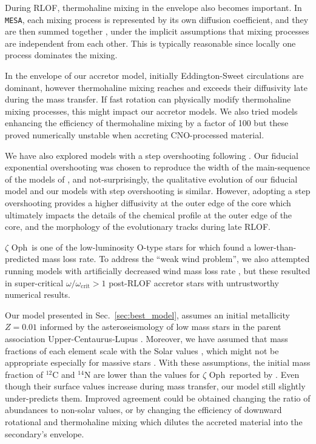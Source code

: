 \documentclass[twocolumn,twocolappendix,trackchanges]{aastex63}
\newcommand{\code}[1]{\texttt{#1}}
\newcommand{\MESA}{\code{MESA}}
\DeclareRobustCommand{\Secref}[1]{Sec.~\ref{#1}}
\newcommand{\zoph}{$\zeta$ Oph}
\begin{document}
During RLOF, thermohaline mixing in the envelope also becomes
important. In \MESA, each mixing process is represented by its own
diffusion coefficient, and they are then summed together
\citep[e.g.,][]{paxton:11}, under the implicit assumptions that mixing
processes are independent from each other. This is typically
reasonable since locally one process dominates the mixing.

In the envelope of our accretor model, initially Eddington-Sweet circulations are
dominant, however thermohaline mixing reaches and exceeds their
diffusivity late during the mass transfer. If fast rotation can
physically modify thermohaline mixing processes, this might impact our
accretor models.  We also tried models enhancing the efficiency of
thermohaline mixing by a factor of 100 \citep{schootemeijer:19} but
these proved numerically unstable when accreting CNO-processed material.

We have also explored models with a step overshooting following
\cite{brott:11}. Our fiducial exponential overshooting was chosen to
reproduce the width of the main-sequence of the models of
\cite{brott:11}, and not-surprisingly, the qualitative evolution of
our fiducial model and our models with step overshooting is
similar. However, adopting a step overshooting provides a higher
diffusivity at the outer edge of the core which ultimately impacts the
details of the chemical profile at the outer edge of the core, and the
morphology of the evolutionary tracks during late RLOF.

\zoph\ is one of the low-luminosity O-type stars for which
\cite{marcolino:09} found a lower-than-predicted mass loss rate.
To address the ``weak wind problem'', we also attempted
running models with artificially decreased wind mass loss rate
\citep[e.g.,][]{renzo:17}, but these resulted in super-critical
$\omega/\omega_\mathrm{crit}>1$ post-RLOF accretor stars with untrustworthy
numerical results.

Our model presented in \Secref{sec:best_model}, assumes an initial
metallicity $Z=0.01$ informed by the asteroseismology of low mass
stars in the parent association Upper-Centaurus-Lupus
\citep[e.g.,][]{murphy:21}. Moreover, we have assumed that mass
fractions of each element scale with the Solar values
\citep{grevesse:98}, which might not be appropriate especially for
massive stars \citep[e.g.,][]{grasha:21}. With these assumptions, the
initial mass fraction of $^{12}\mathrm{C}$ and $^{14}\mathrm{N}$ are
lower than the values for \zoph\ reported by
. Even though their surface values increase
during mass transfer, our model still slightly under-predicts
them. Improved agreement could be obtained changing the ratio of
abundances to non-solar values, or by changing the efficiency of
downward rotational and thermohaline mixing which dilutes the accreted
material into the secondary's envelope.
\end{document}
